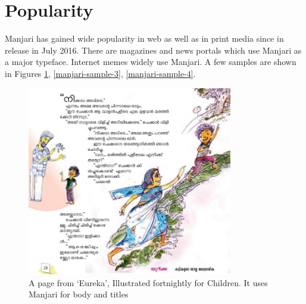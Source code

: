 \documentclass[11pt,twoside,a4paper,parskip=half]{scrartcl}
\begin{document}
\section{Popularity}

Manjari has gained wide popularity in web as well as in print media since in release in July 2016. There are magazines and news portals which use Manjari as a major typeface. Internet memes widely use Manjari. A few samples are shown in Figures \ref{manjari-sample-1}, \ref{manjari-sample-3}, \ref{manjari-sample-4}. 

\begin{figure}[h!]
	\includegraphics[width=0.8\textwidth]{images/manjari-sample-1.png}
	\caption{A page from `Eureka', Illustrated fortnightly for Children. It uses Manjari for body and titles}
	\label{manjari-sample-1}
\end{figure}
\end{document}

